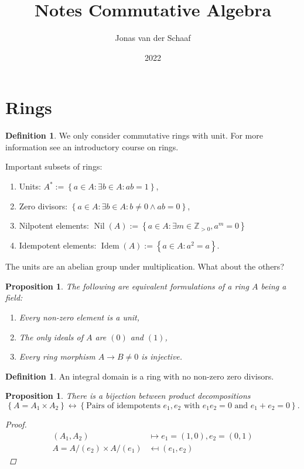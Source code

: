 \documentclass{article}
\title{Notes Commutative Algebra}
\author{Jonas van der Schaaf}
\date{2022}
\newcommand{\Z}{\mathbb{Z}}
\newcommand{\set}[1]{\left\{#1\right\}}
\newcommand{\setwith}[2]{\left\{#1:#2\right\}}
\DeclareMathOperator{\nil}{Nil}
\DeclareMathOperator{\idem}{Idem}
\newtheorem{proposition}[theorem]{Proposition}
\theoremstyle{definition}
\newtheorem{definition}[theorem]{Definition}
\begin{document}
\maketitle

\tableofcontents

\section{Rings}

\begin{definition}
    We only consider commutative rings with unit. For more information see an
    introductory course on rings.
\end{definition}

Important subsets of rings:

\begin{enumerate}
    \item Units: \(A^{*}:=\setwith{a\in A}{\exists b\in A:ab=1}\),
    \item Zero divisors: \(\setwith{a\in A}{\exists b\in A:b\neq0\wedge ab=0}\),
    \item Nilpotent elements: \(\nil(A):=\setwith{a\in A}{\exists m\in\Z_{>0},a^{m}=0}\)
    \item Idempotent elements: \(\idem(A):=\setwith{a\in A}{a^{2}=a}\).
\end{enumerate}

The units are an abelian group under multiplication. What about the others?

\begin{proposition}
    The following are equivalent formulations of a ring \(A\) being a field:
    \begin{enumerate}
        \item Every non-zero element is a unit,
        \item The only ideals of \(A\) are \((0)\) and \((1)\),
        \item Every ring morphism \(A\to B\neq 0\) is injective.
    \end{enumerate}
\end{proposition}

\begin{definition}
    An integral domain is a ring with no non-zero zero divisors.
\end{definition}

\begin{proposition}
    There is a bijection between product decompositions
    \[
        \set{A=A_{1}\times A_{2}}\leftrightarrow\set{\text{Pairs of idempotents \(e_{1},e_{2}\) with \(e_{1}e_{2}=0\) and \(e_{1}+e_{2}=0\)}}.
    \]

    \begin{proof}
        \begin{align*}
            (A_{1},A_{2})               & \mapsto e_{1} =(1,0), e_{2}=(0,1) \\
            A=A/(e_{2})\times A/(e_{1}) & \mapsfrom (e_{1},e_{2})
        \end{align*}
    \end{proof}
\end{proposition}
\end{document}
